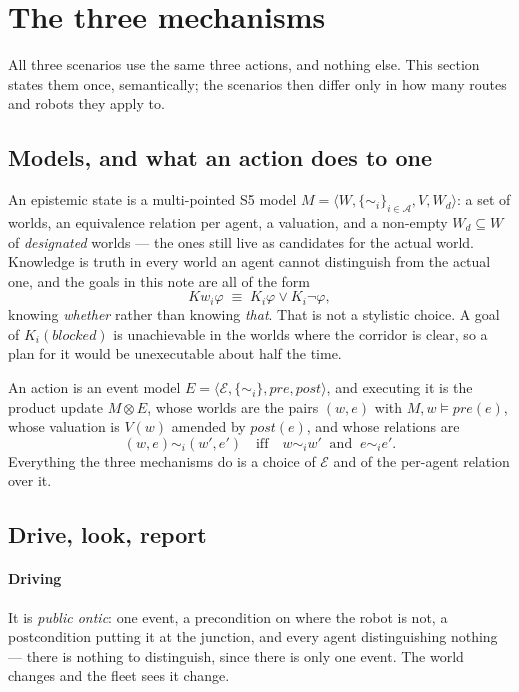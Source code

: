 \documentclass[11pt,a4paper]{article}
\newcommand{\Kw}{\mathit{Kw}}
\newcommand{\blocked}{\mathit{blocked}}
\begin{document}
\section{The three mechanisms}
\label{sec:mechanisms}

All three scenarios use the same three actions, and nothing else. This section
states them once, semantically; the scenarios then differ only in how many
routes and robots they apply to.

\subsection{Models, and what an action does to one}

An epistemic state is a multi-pointed S5 model
$M = \langle W, \{\sim_i\}_{i \in \mathcal{A}}, V, W_d \rangle$: a set of
worlds, an equivalence relation per agent, a valuation, and a non-empty
$W_d \subseteq W$ of \emph{designated} worlds --- the ones still live as
candidates for the actual world. Knowledge is truth in every world an agent
cannot distinguish from the actual one, and the goals in this note are all of
the form
\[
  \Kw_i \varphi \;\equiv\; K_i \varphi \vee K_i \neg\varphi ,
\]
knowing \emph{whether} rather than knowing \emph{that}. That is not a stylistic
choice. A goal of $K_i(\blocked)$ is unachievable in the worlds where the
corridor is clear, so a plan for it would be unexecutable about half the time.

An action is an event model
$E = \langle \mathcal{E}, \{\sim_i\}, \mathit{pre}, \mathit{post} \rangle$, and
executing it is the product update $M \otimes E$, whose worlds are the pairs
$(w,e)$ with $M,w \models \mathit{pre}(e)$, whose valuation is $V(w)$ amended by
$\mathit{post}(e)$, and whose relations are
\[
  (w,e) \sim_i (w',e') \quad\text{iff}\quad w \sim_i w' \ \text{ and }\ e \sim_i e' .
\]
Everything the three mechanisms do is a choice of $\mathcal{E}$ and of the
per-agent relation over it.

\subsection{Drive, look, report}

\paragraph{Driving} It is \emph{public ontic}: one event, a precondition on where
the robot is not, a postcondition putting it at the junction, and every agent
distinguishing nothing --- there is nothing to distinguish, since there is only
one event. The world changes and the fleet sees it change.
\end{document}
